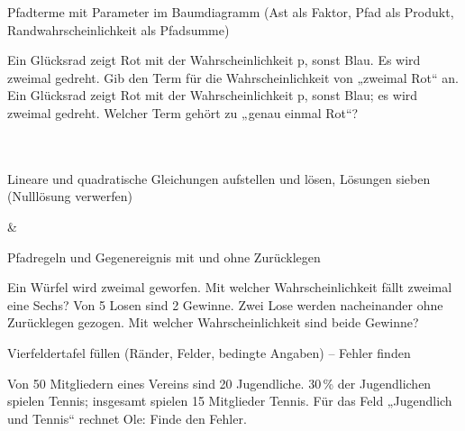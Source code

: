 \begin{aufgabe}{Pfadterme mit Parameter im Baumdiagramm (Ast als Faktor, Pfad als Produkt, Randwahrscheinlichkeit als Pfadsumme)}
\begin{teile}
\teil Ein Glücksrad zeigt Rot mit der Wahrscheinlichkeit p, sonst Blau. Es wird zweimal gedreht. Gib den Term für die Wahrscheinlichkeit von „zweimal Rot“ an.
\teil Ein Glücksrad zeigt Rot mit der Wahrscheinlichkeit p, sonst Blau; es wird zweimal gedreht. Welcher Term gehört zu „genau einmal Rot“? \\  \\  \\ 
\end{teile}
\end{aufgabe}

\begin{aufgabe}{Lineare und quadratische Gleichungen aufstellen und lösen, Lösungen sieben (Nulllösung verwerfen)}
\begin{gleichungsraster}[2]
 &
 \\
\end{gleichungsraster}
\end{aufgabe}

\begin{aufgabe}{Pfadregeln und Gegenereignis mit und ohne Zurücklegen}
\begin{teile}
\teil Ein Würfel wird zweimal geworfen. Mit welcher Wahrscheinlichkeit fällt zweimal eine Sechs? \leerfeld
\teil Von 5 Losen sind 2 Gewinne. Zwei Lose werden nacheinander ohne Zurücklegen gezogen. Mit welcher Wahrscheinlichkeit sind beide Gewinne? \leerfeld
\end{teile}
\end{aufgabe}

\begin{aufgabe}{Vierfeldertafel füllen (Ränder, Felder, bedingte Angaben) – Fehler finden}
\begin{teile}
\teil Von 50 Mitgliedern eines Vereins sind 20 Jugendliche. 30\,\% der Jugendlichen spielen Tennis; insgesamt spielen 15 Mitglieder Tennis. Für das Feld „Jugendlich und Tennis“ rechnet Ole:  Finde den Fehler.
\end{teile}
\end{aufgabe}

